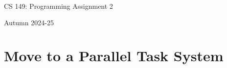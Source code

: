 \documentclass[11pt]{article}
\begin{document}
\fancyhf{}
\setlength{\headheight}{14pt}
\pagestyle{fancy}

\centerline{\Large CS 149: Programming Assignment 2}
\centerline{Autumn 2024-25}

\section{Move to a Parallel Task System}
\end{document}
